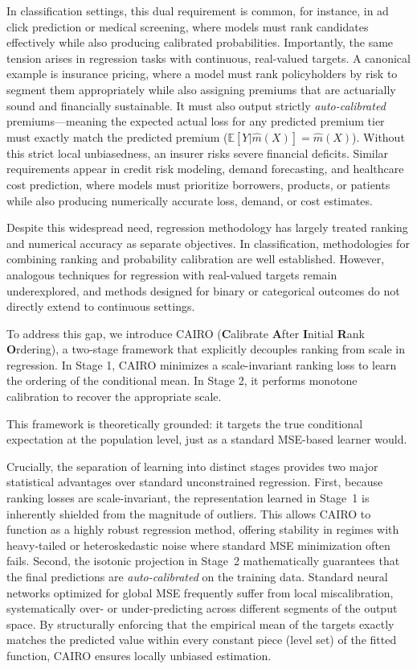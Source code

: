 \documentclass[11pt]{article}
\theoremstyle{plain}
\theoremstyle{plain}
\theoremstyle{plain}
\theoremstyle{plain}
\theoremstyle{plain}
\theoremstyle{plain}
\theoremstyle{plain}
\begin{document}
In classification settings, this dual requirement is common, for instance, in ad click prediction or medical screening, where models must rank candidates effectively while also producing calibrated probabilities. Importantly, the same tension arises in regression tasks with continuous, real-valued targets. A canonical example is insurance pricing, where a model must rank policyholders by risk to segment them appropriately while also assigning premiums that are actuarially sound and financially sustainable. It must also output strictly \emph{auto-calibrated} premiums---meaning the expected actual loss for any predicted premium tier must exactly match the predicted premium ($\mathbb{E}[Y|\hat{m}(X)] = \hat{m}(X)$). Without this strict local unbiasedness, an insurer risks severe financial deficits. Similar requirements appear in credit risk modeling, demand forecasting, and healthcare cost prediction, where models must prioritize borrowers, products, or patients while also producing numerically accurate loss, demand, or cost estimates.

Despite this widespread need, regression methodology has largely treated ranking and numerical accuracy as separate objectives. In classification, methodologies for combining ranking and probability calibration are well established. However, analogous techniques for regression with real-valued targets remain underexplored, and methods designed for binary or  categorical outcomes do not directly extend to continuous settings. 

To address this gap, we introduce \textsc{CAIRO} (\textbf{C}alibrate \textbf{A}fter \textbf{I}nitial \textbf{R}ank \textbf{O}rdering), a two-stage framework that explicitly decouples ranking from scale in regression. In Stage 1, CAIRO minimizes a scale-invariant ranking loss to learn the ordering of the conditional mean. In Stage 2, it performs monotone calibration to recover the appropriate scale.

This framework is theoretically grounded: it targets the true conditional expectation at the population level, just as a standard MSE-based learner would.

Crucially, the separation of learning into distinct stages provides two major statistical advantages over standard unconstrained regression. First, because ranking losses are scale-invariant, the representation learned in Stage~1 is inherently shielded from the magnitude of outliers. This allows \textsc{CAIRO} to function as a highly robust regression method, offering stability in regimes with heavy-tailed or heteroskedastic noise where standard MSE minimization often fails. Second, the isotonic projection in Stage~2 mathematically guarantees that the final predictions are \emph{auto-calibrated} on the training data. Standard neural networks optimized for global MSE frequently suffer from local miscalibration, systematically over- or under-predicting across different segments of the output space. By structurally enforcing that the empirical mean of the targets exactly matches the predicted value within every constant piece (level set) of the fitted function, \textsc{CAIRO} ensures locally unbiased estimation.
\end{document}
